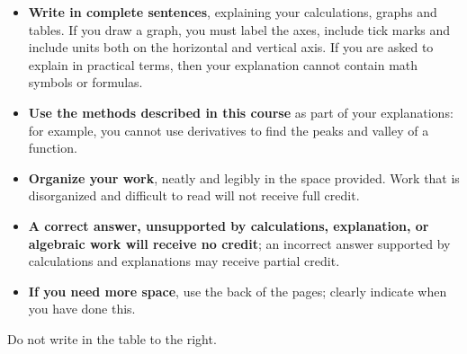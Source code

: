 \documentclass[10pt,answers]{exam}
\begin{document}
\begin{minipage}[t]{3.7in}
\vspace{0pt}
\begin{itemize}

\item \textbf{Write in complete sentences}, explaining your calculations, graphs and tables. If you draw a graph, you must label the axes, include tick marks and include units both on the horizontal and vertical axis. If you are asked to explain in practical terms, then your explanation cannot contain math symbols or formulas.
\item \textbf{Use the methods described in this course} as part of your explanations: for example, you cannot use derivatives to find the peaks and valley of a function.

\item \textbf{Organize your work}, neatly and legibly in
the space provided. Work that is disorganized and difficult to read will not receive full credit.  

\item \textbf{A correct answer, unsupported by calculations, explanation,
or algebraic work will receive no credit}; an incorrect answer supported
by  calculations and explanations may receive
partial credit.


\item \textbf{If you need more space}, use the back of the pages; clearly indicate when you have done this.
\end{itemize}

Do not write in the table to the right.
\end{minipage}
\hfill
\begin{minipage}[t]{2.3in}
\vspace{0pt}
\addpoints %
\combinedgradetable[v][pages]  %

\end{minipage}
\newpage




\end{document}
